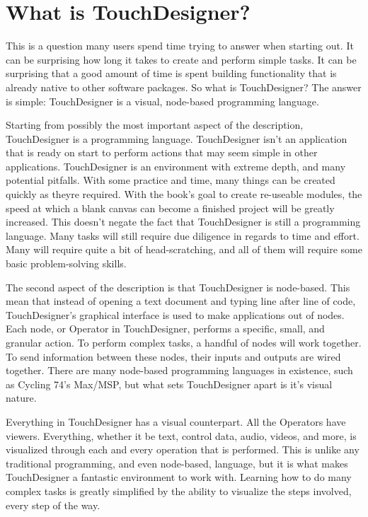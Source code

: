 \section{What is TouchDesigner?}
\begin{fullwidth}

This is a question many users spend time trying to answer when starting out. It can be surprising how long it takes to create and perform simple tasks. It can be surprising that a good amount of time is spent building functionality that is already native to other software packages. So what is TouchDesigner? The answer is simple: TouchDesigner is a visual, node-based programming language.

Starting from possibly the most important aspect of the description, TouchDesigner is a programming language. TouchDesigner isn't an application that is ready on start to perform actions that may seem simple in other applications. TouchDesigner is an environment with extreme depth, and many potential pitfalls. With some practice and time, many things can be created quickly as theyre required. With the book's goal to create re-useable modules, the speed at which a blank canvas can become a finished project will be greatly increased. This doesn't negate the fact that TouchDesigner is still a programming language. Many tasks will still require due diligence in regards to time and effort. Many will require quite a bit of head-scratching, and all of them will require some basic problem-solving skills. 

The second aspect of the description is that TouchDesigner is node-based. This mean that instead of opening a text document and typing line after line of code, TouchDesigner's graphical interface is used to make applications out of nodes. Each node, or Operator in TouchDesigner, performs a specific, small, and granular action. To perform complex tasks, a handful of nodes will work together. To send information between these nodes, their inputs and outputs are wired together. There are many node-based programming languages in existence, such as Cycling 74's Max/MSP, but what sets TouchDesigner apart is it's visual nature.

Everything in TouchDesigner has a visual counterpart. All the Operators have viewers. Everything, whether it be text, control data, audio, videos, and more, is visualized through each and every operation that is performed. This is unlike any traditional programming, and even node-based, language, but it is what makes TouchDesigner a fantastic environment to work with. Learning how to do many complex tasks is greatly simplified by the ability to visualize the steps involved, every step of the way. 

\end{fullwidth}
